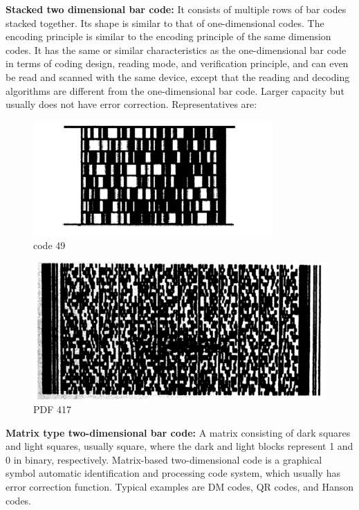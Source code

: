 \documentclass[journal]{IEEEtran}
\begin{document}
\textbf{Stacked two dimensional bar code:} It consists of multiple rows of bar codes stacked together. Its shape is similar to that of one-dimensional codes. The encoding principle is similar to the encoding principle of the same dimension codes. It has the same or similar characteristics as the one-dimensional bar code in terms of coding design, reading mode, and verification principle, and can even be read and scanned with the same device, except that the reading and decoding algorithms are different from the one-dimensional bar code. Larger capacity but usually does not have error correction.
Representatives are:


\begin{figure}[htbp]
\centerline{\includegraphics[scale=1]{code49.png}}
\caption{code 49}
\label{fig}
\end{figure}


\begin{figure}[htbp]
\centerline{\includegraphics[scale=0.5]{PDF417.png}}
\caption{PDF 417}
\label{fig}
\end{figure}

\textbf{Matrix type two-dimensional bar code:}
A matrix consisting of dark squares and light squares, usually square, where the dark and light blocks represent 1 and 0 in binary, respectively. Matrix-based two-dimensional code is a graphical symbol automatic identification and processing code system, which usually has error correction function. Typical examples are DM codes, QR codes, and Hanson codes.
\end{document}

